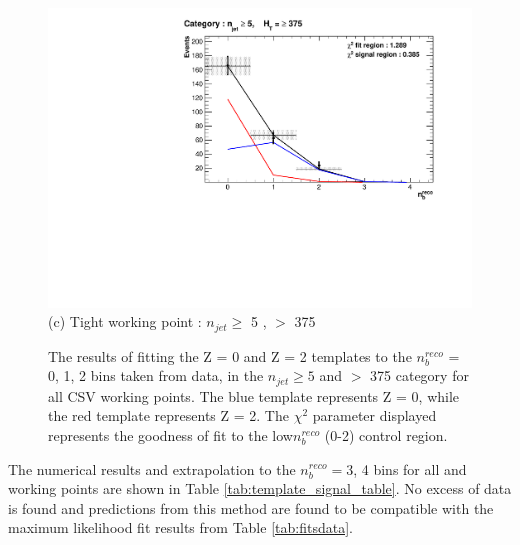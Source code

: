 \begin{figure}[ht]
\begin{minipage}[b]{0.51\linewidth}
\centering
\includegraphics[width = 1.0\linewidth]{plots/TemplatesSignal/Final_Fit_To_Data_Normal_Tight_HTBin_Template_375_jet_mult_5.pdf}
\centering (c) Tight working point :  $n_{jet} \geq$ 5 , \theht $>$ 375 
\end{minipage}
\caption[The results of fitting the Z = 0 and Z = 2 templates to the $n_{b}^{reco}$ = 0, 1, 2 bins taken from data, in the $n_{jet} \geq 5$ and \theht $>$ 375 category for all \ac{CSV} working points.]{The results of fitting the Z = 0 and Z = 2 templates to the $n_{b}^{reco}$ = 0, 1, 2 bins taken from data, in the $n_{jet} \geq 5$ and \theht $>$ 375 category for all \ac{CSV} working points. The blue template represents Z = 0, while the red template represents Z = 2. The $\chi^{2}$ parameter displayed represents the goodness of fit to the low$ n_{b}^{reco}$ (0-2) control region.}
\label{fig:template_data_signal_njet5}
\end{figure}

The numerical results and extrapolation to the $n_{b}^{reco} =$3, 4 bins for all \theht and working points are shown in Table \ref{tab:template_signal_table}. No excess of data is found and predictions from this method are found to be compatible with the \alphat maximum likelihood fit results from Table \ref{tab:fitsdata}.

